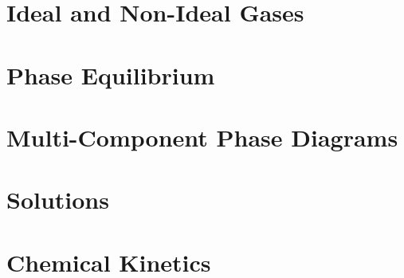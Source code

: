 \documentclass[
]{book}
\theoremstyle{definition}
\theoremstyle{definition}
\theoremstyle{definition}
\theoremstyle{remark}
\begin{document}
\hypertarget{RealGases}{%
\chapter{Ideal and Non-Ideal Gases}\label{RealGases}}

\hypertarget{PhaseEquilibrium}{%
\chapter{Phase Equilibrium}\label{PhaseEquilibrium}}

\hypertarget{MCPhaseDiagrams}{%
\chapter{Multi-Component Phase Diagrams}\label{MCPhaseDiagrams}}

\hypertarget{Solutions}{%
\chapter{Solutions}\label{Solutions}}

\hypertarget{Kinetics}{%
\chapter{Chemical Kinetics}\label{Kinetics}}

  
\end{document}
